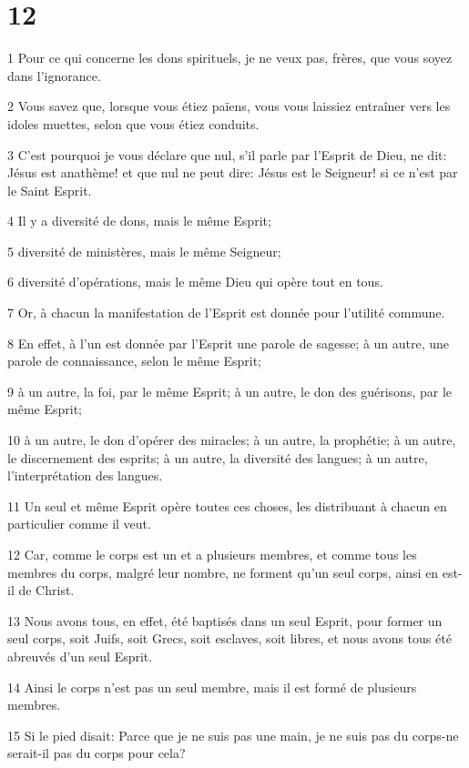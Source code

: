 \chapter{12}

\par 1 Pour ce qui concerne les dons spirituels, je ne veux pas, frères, que vous soyez dans l'ignorance.
\par 2 Vous savez que, lorsque vous étiez païens, vous vous laissiez entraîner vers les idoles muettes, selon que vous étiez conduits.
\par 3 C'est pourquoi je vous déclare que nul, s'il parle par l'Esprit de Dieu, ne dit: Jésus est anathème! et que nul ne peut dire: Jésus est le Seigneur! si ce n'est par le Saint Esprit.
\par 4 Il y a diversité de dons, mais le même Esprit;
\par 5 diversité de ministères, mais le même Seigneur;
\par 6 diversité d'opérations, mais le même Dieu qui opère tout en tous.
\par 7 Or, à chacun la manifestation de l'Esprit est donnée pour l'utilité commune.
\par 8 En effet, à l'un est donnée par l'Esprit une parole de sagesse; à un autre, une parole de connaissance, selon le même Esprit;
\par 9 à un autre, la foi, par le même Esprit; à un autre, le don des guérisons, par le même Esprit;
\par 10 à un autre, le don d'opérer des miracles; à un autre, la prophétie; à un autre, le discernement des esprits; à un autre, la diversité des langues; à un autre, l'interprétation des langues.
\par 11 Un seul et même Esprit opère toutes ces choses, les distribuant à chacun en particulier comme il veut.
\par 12 Car, comme le corps est un et a plusieurs membres, et comme tous les membres du corps, malgré leur nombre, ne forment qu'un seul corps, ainsi en est-il de Christ.
\par 13 Nous avons tous, en effet, été baptisés dans un seul Esprit, pour former un seul corps, soit Juifs, soit Grecs, soit esclaves, soit libres, et nous avons tous été abreuvés d'un seul Esprit.
\par 14 Ainsi le corps n'est pas un seul membre, mais il est formé de plusieurs membres.
\par 15 Si le pied disait: Parce que je ne suis pas une main, je ne suis pas du corps-ne serait-il pas du corps pour cela?
